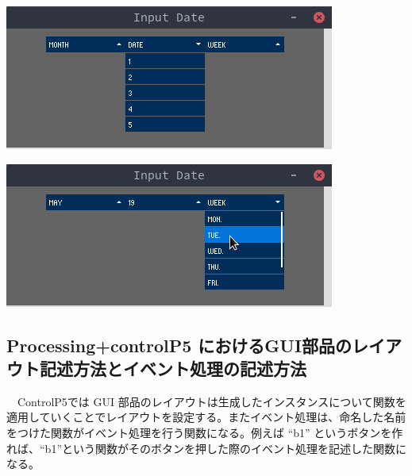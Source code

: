 \documentclass{scrartcl}
\begin{document}
\begin{center}
\includegraphics[width=0.3\linewidth]{./img/ensyuu6-1.png}
\end{center}

\begin{center}
\includegraphics[width=0.3\linewidth]{./img/ensyuu6-2.png}
\end{center}

\subsection{Processing+controlP5 におけるGUI部品のレイアウト記述方法とイベント処理の記述方法}
\label{sec:org40bc3e0}
　ControlP5では GUI 部品のレイアウトは生成したインスタンスについて関数を適用していくことでレイアウトを設定する。またイベント処理は、命名した名前をつけた関数がイベント処理を行う関数になる。例えば ``b1'' というボタンを作れば、``b1''という関数がそのボタンを押した際のイベント処理を記述した関数になる。\\
\end{document}
